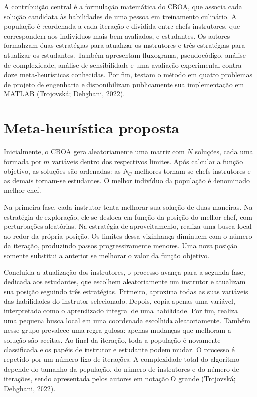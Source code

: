 \documentclass[12pt,a4paper]{article}
\begin{document}
A contribuição central é a formulação matemática do CBOA, que associa cada
solução candidata às habilidades de uma pessoa em treinamento culinário. A
população é reordenada a cada iteração e dividida entre chefs instrutores, que
correspondem aos indivíduos mais bem avaliados, e estudantes. Os autores
formalizam duas estratégias para atualizar os instrutores e três estratégias
para atualizar os estudantes. Também apresentam fluxograma, pseudocódigo,
análise de complexidade, análise de sensibilidade e uma avaliação experimental
contra doze meta-heurísticas conhecidas. Por fim, testam o método em quatro
problemas de projeto de engenharia e disponibilizam publicamente sua
implementação em MATLAB (Trojovská; Dehghani, 2022).

\section{Meta-heurística proposta}

Inicialmente, o CBOA gera aleatoriamente uma matriz com $N$ soluções, cada uma
formada por $m$ variáveis dentro dos respectivos limites. Após calcular a
função objetivo, as soluções são ordenadas: as $N_C$ melhores tornam-se chefs
instrutores e as demais tornam-se estudantes. O melhor indivíduo da população
é denominado melhor chef.

Na primeira fase, cada instrutor tenta melhorar sua solução de duas maneiras.
Na estratégia de exploração, ele se desloca em função da posição do melhor
chef, com perturbações aleatórias. Na estratégia de aproveitamento, realiza uma
busca local ao redor da própria posição. Os limites dessa vizinhança diminuem
com o número da iteração, produzindo passos progressivamente menores. Uma nova
posição somente substitui a anterior se melhorar o valor da função objetivo.

Concluída a atualização dos instrutores, o processo avança para a segunda
fase, dedicada aos estudantes, que escolhem aleatoriamente um instrutor e
atualizam sua posição seguindo três estratégias. Primeiro, aproxima todas as
suas variáveis das habilidades do instrutor selecionado. Depois, copia apenas
uma variável, interpretada como o aprendizado integral de uma habilidade. Por
fim, realiza uma pequena busca local em uma coordenada escolhida
aleatoriamente. Também nesse grupo prevalece uma regra gulosa: apenas
mudanças que melhoram a solução são aceitas. Ao final da iteração, toda a
população é novamente classificada e os papéis de instrutor e estudante podem
mudar. O processo é repetido por um número fixo de iterações. A complexidade
total do algoritmo depende do tamanho da população, do número de instrutores
e do número de iterações, sendo apresentada pelos autores em notação O grande
(Trojovská; Dehghani, 2022).
\end{document}
